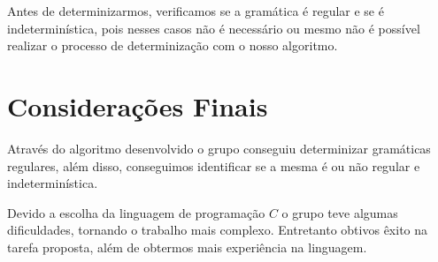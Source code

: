 \documentclass[10pt,a4paper,titlepage]{hitec}
\begin{document}
Antes de determinizarmos, verificamos se a gramática é regular e se é indeterminística, pois nesses casos não é necessário ou mesmo não é possível realizar o processo de determinização com o nosso algoritmo.

\section*{Considerações Finais}

Através do algoritmo desenvolvido o grupo conseguiu determinizar gramáticas regulares, além disso, conseguimos identificar se a mesma é ou não regular e indeterminística. 

Devido a escolha da linguagem de programação $C$ o grupo teve algumas dificuldades, tornando o trabalho mais complexo. Entretanto obtivos êxito na tarefa proposta, além de obtermos mais experiência na linguagem.
\end{document}
